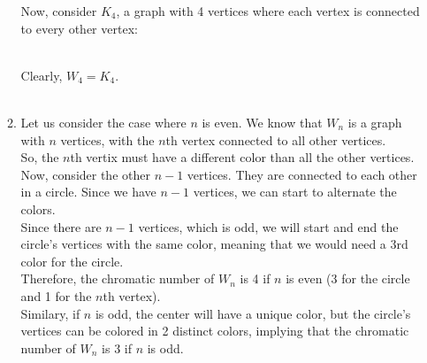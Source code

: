 \documentclass[a4paper]{article}
\begin{document}
\begin{enumerate}
\begin{enumerate}
            Now, consider $K_4$, a graph with 4 vertices where each vertex is connected to every other vertex: \\
            \\

            Clearly, $W_4 = K_4$. \\ \\

            \item Let us consider the case where $n$ is even. We know that $W_n$ is a graph with $n$ vertices, with the $n$th vertex connected to all other vertices. \\

            So, the $n$th vertix must have a different color than all the other vertices. \\

            Now, consider the other $n-1$ vertices. They are connected to each other in a circle. Since we have $n-1$ vertices, we can start to alternate the colors. \\

            Since there are $n-1$ vertices, which is odd, we will start and end the circle's vertices with the same color, meaning that we would need a 3rd color for the circle. \\

            Therefore, the chromatic number of $W_n$ is 4 if $n$ is even (3 for the circle and 1 for the $n$th vertex). \\

            Similary, if $n$ is odd, the center will have a unique color, but the circle's vertices can be colored in 2 distinct colors, implying that the chromatic number of $W_n$ is 3 if $n$ is odd. \\
        \end{enumerate}


\end{enumerate}
\end{document}
